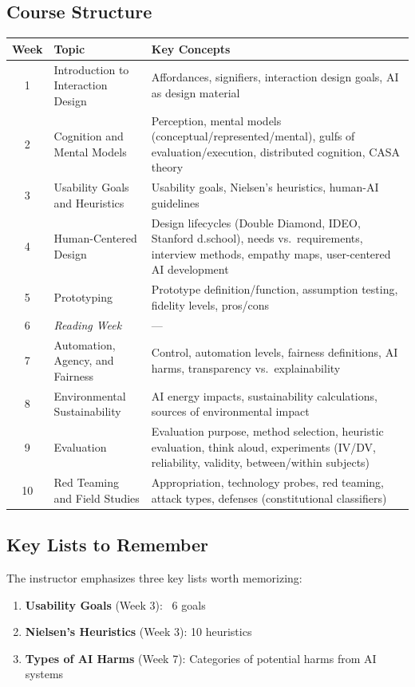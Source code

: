 \subsection*{Course Structure}

\begin{center}
\renewcommand{\arraystretch}{1.3}
\begin{tabular}{@{} c l p{7cm} @{}}
\toprule
\textbf{Week} & \textbf{Topic} & \textbf{Key Concepts} \\
\midrule
1 & Introduction to Interaction Design & Affordances, signifiers, interaction design goals, AI as design material \\
2 & Cognition and Mental Models & Perception, mental models (conceptual/represented/mental), gulfs of evaluation/execution, distributed cognition, CASA theory \\
3 & Usability Goals and Heuristics & Usability goals, Nielsen's heuristics, human-AI guidelines \\
4 & Human-Centered Design & Design lifecycles (Double Diamond, IDEO, Stanford d.school), needs vs.\ requirements, interview methods, empathy maps, user-centered AI development \\
5 & Prototyping & Prototype definition/function, assumption testing, fidelity levels, pros/cons \\
6 & \textit{Reading Week} & --- \\
7 & Automation, Agency, and Fairness & Control, automation levels, fairness definitions, AI harms, transparency vs.\ explainability \\
8 & Environmental Sustainability & AI energy impacts, sustainability calculations, sources of environmental impact \\
9 & Evaluation & Evaluation purpose, method selection, heuristic evaluation, think aloud, experiments (IV/DV, reliability, validity, between/within subjects) \\
10 & Red Teaming and Field Studies & Appropriation, technology probes, red teaming, attack types, defenses (constitutional classifiers) \\
\bottomrule
\end{tabular}
\end{center}

\subsection*{Key Lists to Remember}

The instructor emphasizes three key lists worth memorizing:
\begin{enumerate}
  \item \textbf{Usability Goals} (Week 3): ~6 goals
  \item \textbf{Nielsen's Heuristics} (Week 3): 10 heuristics
  \item \textbf{Types of AI Harms} (Week 7): Categories of potential harms from AI systems
\end{enumerate}

